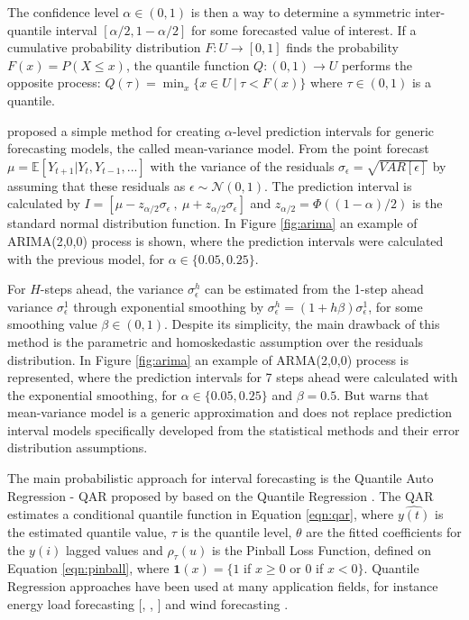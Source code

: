 The confidence level $\alpha \in (0,1)$ is then a way to determine a symmetric inter-quantile interval $[\alpha/2, 1-\alpha/2]$ for some forecasted value of interest. If a cumulative probability distribution $F:U \rightarrow [0,1]$ finds the probability $F(x) =  P(X \leq x)$, the quantile function $Q:(0,1) \rightarrow U$ performs the opposite process: $Q(\tau) = \min_x\{ x \in U \ |\ \tau < F(x) \}$ where $\tau \in (0,1)$ is a quantile.


\cite{Chatfield2001} proposed a simple method for creating $\alpha$-level prediction intervals for generic forecasting models, the called mean-variance model. From the point forecast $\mu = \mathbb{E}[Y_{t+1}|Y_t,Y_{t-1},...]$ with the variance of the residuals $\sigma_\epsilon = \sqrt{VAR[\epsilon]}$ by assuming that these residuals as $\epsilon \sim \mathcal{N}(0,1)$. The prediction interval is calculated by $I = [\mu - z_{\alpha/2}\sigma_\epsilon\ ,\ \mu + z_{\alpha/2}\sigma_\epsilon]$ and $z_{\alpha/2} = \Phi((1- \alpha)/2)$ is the standard normal distribution function. In Figure \ref{fig:arima} an example of ARIMA(2,0,0) process is shown, where the prediction intervals were calculated with the previous model, for $\alpha \in \{0.05,0.25\}$. 

For $H$-steps ahead, the variance $\sigma_\epsilon^h$ can be estimated from the 1-step ahead variance $\sigma_\epsilon^1$ through exponential smoothing by $\sigma_\epsilon^h = (1 + h\beta)\sigma_\epsilon^1$, for some smoothing value $\beta \in (0,1)$. Despite its simplicity, the main drawback of this method is the parametric and homoskedastic assumption over the residuals distribution. In Figure \ref{fig:arima} an example of ARMA(2,0,0) process is represented, where the prediction intervals for 7 steps ahead were calculated with the exponential smoothing, for $\alpha \in \{0.05,0.25\}$ and $\beta = 0.5$. But \cite{Chatfield2001} warns that mean-variance model is a generic approximation and does not replace prediction interval models specifically developed from the statistical methods and their error distribution assumptions. 


The main probabilistic approach for interval forecasting is the Quantile Auto Regression - QAR proposed by \cite{Koenker2006} based on the Quantile Regression \cite{Koenker2001}. The QAR estimates a conditional quantile function in Equation \eqref{eqn:qar}, where $\hat{y(t)}$ is the estimated quantile value, $\tau$ is the quantile level, $\theta$ are the fitted coefficients for the $y(i)$ lagged values and $\rho_\tau(u)$ is the Pinball Loss Function, defined on Equation \eqref{eqn:pinball}, where $\mathbf{1}(x) = \{ 1$ if $x \geq 0$ or $0$ if $x < 0\}$. Quantile Regression approaches have been used at many application fields, for instance energy load forecasting [\cite{Liu2015}, \cite{Hong2016}, \cite{Hong2016a}] and wind forecasting \cite{Pinson2006}.

